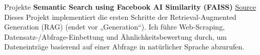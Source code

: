 \begin{rubric}{Projekte}
\entry*[2024] \textbf{Semantic Search using Facebook AI Similarity (FAISS)} \hfill \href{https://github.com/NathanCorral/Hugging-Face-FAISS-Semantic-Search}{\faGithub Source} \newline
Dieses Projekt implementiert die ersten Schritte der Retrieval-Augmented Generation (RAG) (endet vor „Generation“). Ich führe Web-Scraping, Datensatz-/Abfrage-Einbettung und Ähnlichkeitsbewertung durch, um Dateneinträge basierend auf einer Abfrage in natürlicher Sprache abzurufen.

\begin{comment}
\entry*[2021] \textbf{Temporal Convolutional Network} \newline  
Im Rahmen eines Klassenprojekts haben wir das Multi-Stage Temporal Convolutional Network\footnote{Y. Abu Farha et al., "MS-TCN: Multi-Stage Temporal Convolutional Network for Action Segmentation." CVPR 2019.} in PyTorch neu implementiert. Dieses Projekt erreichte: \newline  
\vspace{\CVItemizeHeaderSpacing} \begin{itemize}  
	\setlength{\itemsep}{\CVItemizeSpacing}  
	\item Verständnis für state-of-the-art (2019) Computer-Vision-Netzwerke zur Klassifikation von Videoaktionen.  
	\item Training und Testen des Modells auf einem Teil eines aktiv genutzten Datensatzes ($\approx$30 \% des Breakfast Actions Dataset).  
	\item Verifizierung der im Paper angegebenen Ergebnisse (66 \% Genauigkeit).  
\end{itemize}  

\entry*[2016] \textbf{Tower of Hanoi} \newline  
Ich programmierte einen Roboterarm, um das Spiel Tower of Hanoi vollständig automatisiert zu spielen. Die Projektziele umfassten: \newline  
\vspace{\CVItemizeHeaderSpacing} \begin{itemize}  
	\setlength{\itemsep}{\CVItemizeSpacing}  
	\item Berechnung der inversen Kinematik für einen ROS-gesteuerten Rhino-RX2-Arm und deren Programmierung in C++.  
	\item Anbringung einer nach unten gerichteten Kamera und Entwicklung eines Computer-Vision-Nodes zur Identifizierung von Blöcken in der Roboter-Ebene.  
	\item Festlegung der Turmzentren und Programmierung der Spiellogik von Tower of Hanoi.  
\end{itemize}  
\end{comment}


\end{rubric}

